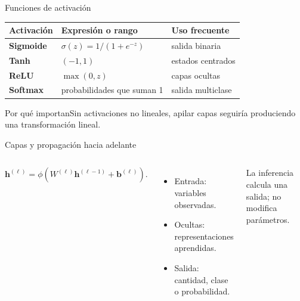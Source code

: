 \documentclass[aspectratio=169,10pt]{beamer}
\begin{document}
\begin{frame}{Funciones de activación}
  \small
  \begin{tabularx}{\textwidth}{>{\bfseries}p{}p{}X}\toprule
  Activación & Expresión o rango & Uso frecuente\\\midrule
  Sigmoide & $\sigma(z)=1/(1+e^{-z})$ & salida binaria\\
  Tanh & $(-1,1)$ & estados centrados\\
  ReLU & $\max(0,z)$ & capas ocultas\\
  Softmax & probabilidades que suman 1 & salida multiclase\\\bottomrule
  \end{tabularx}
  \begin{block}{Por qué importan}Sin activaciones no lineales, apilar capas seguiría produciendo una transformación lineal.\end{block}
\end{frame}

\begin{frame}{Capas y propagación hacia adelante}
  \begin{columns}[T]
    \centering
    \small
    \[
      \mathbf{h}^{(\ell)}=\phi\!\left(W^{(\ell)}\mathbf{h}^{(\ell-1)}+\mathbf{b}^{(\ell)}\right).
    \]
    \begin{itemize}
      \item Entrada: variables observadas.
      \item Ocultas: representaciones aprendidas.
      \item Salida: cantidad, clase o probabilidad.
    \end{itemize}
    La inferencia calcula una salida; no modifica parámetros.
  \end{columns}
\end{frame}
\end{document}
